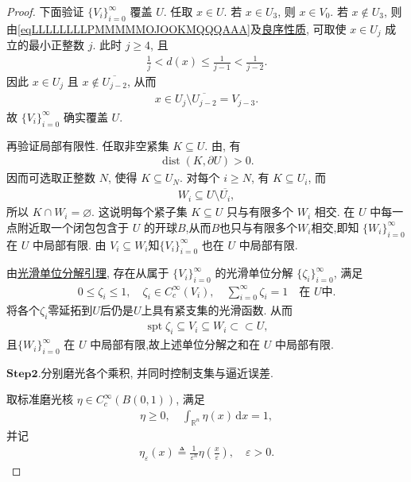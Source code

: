 \documentclass[../../main.tex]{subfiles}
\begin{document}
\begin{proof}
下面验证 $\{V_i\}_{i=0}^{\infty}$ 覆盖 $U$.
任取 $x\in U$. 若 $x\in U_3$, 则 $x\in V_0$.
若 $x\notin U_3$, 则由\eqref{eqLLLLLLLLPMMMMMOJOOKMQQQAAA}及\hyperref[Topology(Munkres)-theorem:ch01-良序性质]{良序性质}, 可取使 $x\in U_j$ 成立的最小正整数 $j$. 此时 $j\geqslant4$, 且
\begin{align*}
\frac{1}{j}<d(x)\leqslant\frac{1}{j-1}<\frac{1}{j-2}.
\end{align*}
因此 $x\in U_j$ 且 $x\notin\overline{U_{j-2}}$, 从而
\begin{align*}
x\in U_j\setminus\overline{U_{j-2}}=V_{j-3}.
\end{align*}
故 $\{V_i\}_{i=0}^{\infty}$ 确实覆盖 $U$.

再验证局部有限性.
任取非空紧集 $K\subseteq U$.
由, 有
\begin{align*}
\operatorname{dist}(K,\partial U)>0.
\end{align*}
因而可选取正整数 $N$, 使得 $K\subseteq U_N$.
对每个 $i\geqslant N$, 有 $K\subseteq U_i$, 而
\begin{align*}
W_i\subseteq U\setminus\overline{U_i},
\end{align*}
所以 $K\cap W_i=\varnothing$.
这说明每个紧子集 $K\subseteq U$ 只与有限多个 $W_i$ 相交.
在 $U$ 中每一点附近取一个闭包包含于 $U$ 的开球$B$,从而$B$也只与有限多个$W_i$相交,即知 $\{W_i\}_{i=0}^{\infty}$ 在 $U$ 中局部有限.
由 $V_i\subseteq W_i$知$\{V_i\}_{i=0}^{\infty}$ 也在 $U$ 中局部有限.

由\hyperref[lemma:ch05-光滑单位分解-p7R3]{光滑单位分解引理}, 存在从属于 $\{V_i\}_{i=0}^{\infty}$ 的光滑单位分解 $\{\zeta_i\}_{i=0}^{\infty}$, 满足
\begin{align}
0\leqslant\zeta_i\leqslant1,\quad
\zeta_i\in C_c^\infty(V_i),\quad
\sum\limits_{i=0}^{\infty}\zeta_i=1
\quad\text{在 }U\text{中}.
\label{align:ch05-单位分解-a8L2}
\end{align}
将各个$\zeta_i$零延拓到$U$后仍是$U$上具有紧支集的光滑函数.
从而
\begin{align}\label{eqJIOJFIOIWIOURIOWORWPPPPPJAAFAAFAAWFASCcc2}
\operatorname{spt}\zeta_i\subseteq V_i\subseteq W_i\subset \subset U,
\end{align}
且$\{W_i\}_{i=0}^{\infty}$ 在 $U$ 中局部有限,故上述单位分解之和在 $U$ 中局部有限.

\noindent$\mathbf{Step}\mathbf{2}.${\heiti 分别磨光各个乘积, 并同时控制支集与逼近误差.}

取标准磨光核 $\eta\in C_c^\infty(B(0,1))$, 满足
\begin{align*}
\eta\geqslant0,\quad
\int_{\mathbb{R}^n}\eta(x)\,\mathrm{d}x=1,
\end{align*}
并记
\begin{align*}
\eta_\varepsilon(x)
\triangleq\frac{1}{\varepsilon^n}
\eta\left(\frac{x}{\varepsilon}\right),
\quad \varepsilon>0.
\end{align*}


\end{proof}
\end{document}
